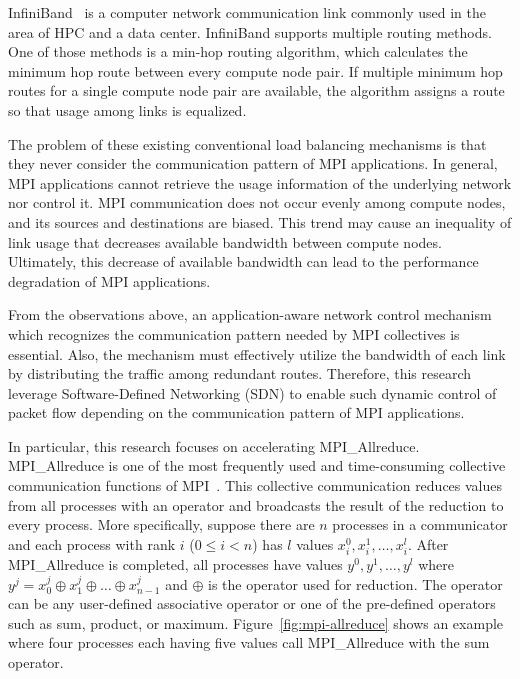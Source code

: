 InfiniBand~\autocite{Buyya2009} is a computer network communication link
commonly used in the area of HPC and a data center. InfiniBand supports
multiple routing methods. One of those methods is a min-hop routing
algorithm, which calculates the minimum hop route between every
compute node pair. If multiple minimum hop routes for a single
compute node pair are available, the algorithm assigns a route so that
usage among links is equalized.

The problem of these existing conventional load balancing mechanisms is
that they never consider the communication pattern of MPI applications. In
general, MPI applications cannot retrieve the usage information of the
underlying network nor control it. MPI communication does not occur evenly
among compute nodes, and its sources and destinations are biased. This trend
may cause an inequality of link usage that decreases available bandwidth
between compute nodes. Ultimately, this decrease of available bandwidth can
lead to the performance degradation of MPI applications.

From the observations above, an application-aware network control mechanism
which recognizes the communication pattern needed by MPI collectives is
essential. Also, the mechanism must effectively utilize the bandwidth of each
link by distributing the traffic among redundant routes. Therefore, this
research leverage Software-Defined Networking (SDN) to enable such dynamic
control of packet flow depending on the communication pattern of MPI
applications.

In particular, this research focuses on accelerating MPI\_Allreduce.
MPI\_Allreduce is one of the most frequently used and time-consuming
collective communication functions of MPI\@~\cite{Chunduri2018}.
This collective communication reduces values from all
processes with an operator and broadcasts the result of the reduction to every
process. More specifically, suppose there are $n$ processes in a communicator
and each process with rank $i$ ($0 \leq i < n$) has $l$ values $x_i^0, x_i^1,
\dots, x_i^l$. After MPI\_Allreduce is completed, all processes have values
$y^0, y^1, \dots, y^l$ where $y^j = x_0^j \oplus x_1^j \oplus \dots \oplus
x_{n-1}^j$ and $\oplus$ is the operator used for reduction. The operator can
be any user-defined associative operator or one of the pre-defined operators
such as sum, product, or maximum. Figure~\ref{fig:mpi-allreduce} shows an
example where four processes each having five values call MPI\_Allreduce with
the sum operator.

